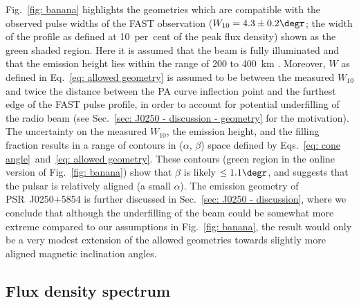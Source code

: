 Fig.~\ref{fig: banana} highlights the geometries which are compatible with the observed pulse widths of the FAST observation ($W_{10}=4.3\pm0.2\degr$; the width of the profile as defined at 10~per~cent of the peak flux density) shown as the green shaded region. Here it is assumed that the beam is fully illuminated and that the emission height lies within the range of 200 to 400~km \citep[e.g.][]{MRxx2002, JKxx2019}. Moreover, $W$ as defined in Eq.~\eqref{eq: allowed geometry} is assumed to be between the measured $W_{10}$ and twice the distance between the PA curve inflection point and the furthest edge of the FAST pulse profile, in order to account for potential underfilling of the radio beam (see Sec.~\ref{sec: J0250 - discussion - geometry} for the  motivation). The uncertainty on the measured $W_{10}$, the emission height, and the filling fraction results in a range of contours in ($\alpha$, $\beta$) space defined by Eqs.~\eqref{eq: cone angle}~and~\eqref{eq: allowed geometry}. These contours (green region in the online version of Fig.~\ref{fig: banana}) show that $\beta$ is likely $\leq1.1\degr$, and suggests that the pulsar is relatively aligned (a small $\alpha$). The emission geometry of PSR~J0250+5854 is further discussed in Sec.~\ref{sec: J0250 - discussion}, where we conclude that although the underfilling of the beam could be somewhat more extreme compared to our assumptions in Fig.~\ref{fig: banana}, the result would only be a very modest extension of the allowed geometries towards slightly more aligned magnetic inclination angles.


\subsection{Flux density spectrum}
\label{sec: J0250 - analysis - flux}

